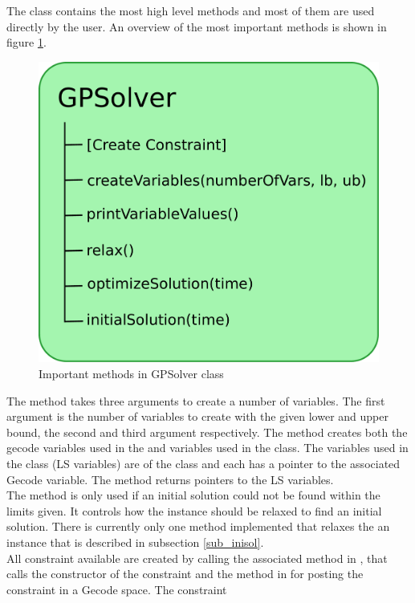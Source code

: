 The \gensol class contains the most high level methods and most of them are used directly by the user. An overview of 
the most important methods is shown in figure \ref{fig_general}. \\ \noindent
\begin{figure}[!b] 
\begin{center}
\includegraphics[width=0.8\linewidth]{general.pdf} \caption{Important methods in GPSolver class} 
\label{fig_general}
\end{center} 
\end{figure} 
The method  takes three arguments to create a number of variables. The first argument 
is the number of variables to create with the given lower and upper bound, the second and third argument respectively. 
The method creates both the gecode variables used in the  and variables used in the 
 class. The variables used in the  class (LS variables) are of the 
class 
 and each has a pointer to the associated Gecode variable. The method returns pointers to the LS 
variables. \\ 
The method  is only used if an initial solution could not be found within the limits given. It controls 
how the instance should be relaxed to find an initial solution. There is currently only one method implemented that 
relaxes the an instance that is described in subsection \ref{sub_inisol}. \\
All constraint available are created by calling the associated method in \gensol, that calls the constructor 
of the constraint and the method in  for posting the constraint in a Gecode space. The constraint 
